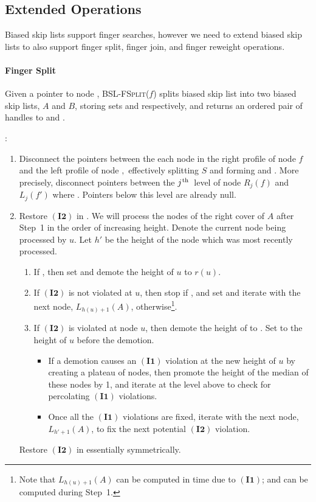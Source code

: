 \documentclass[11pt]{article}
\newcommand{\ens}[1]{\ensuremath{#1}}
\newcommand{\jth}{\ens{j^{\mbox{\hspace{.2mm}\scriptsize th}}}}
\newcommand{\Bslfsplx}[1]{\mbox{\textsc{BSL-FSplit(\ensuremath{#1})}}}
\newcommand{\invone}{\ensuremath{\mathbf{(I1)}}}
\newcommand{\invtwo}{\ensuremath{\mathbf{(I2)}}}
\newcommand{\prevheight}{\ensuremath{h'}}
\newcommand{\nodeheight}[1]{\ensuremath{h(#1)}}
\newcommand{\noderank}[1]{\ensuremath{r(\node #1)}}
\newcommand{\node}[1]{\ensuremath{#1}}
\newcommand{\bsl}[1]{\ensuremath{#1}}
\newcommand{\lvlpre}[2]{\ensuremath{L_{#1}(#2)}}
\newcommand{\lvlsuc}[2]{\ensuremath{R_{#1}(#2)}}
\begin{document}
\subsection{Extended Operations} 
\label{subsec:BSLExtOps} 
Biased skip lists support finger searches, however we need to extend biased skip lists to also support finger split, finger join, and finger reweight operations. 


\paragraph{Finger Split} Given a pointer to node , \Bslfsplx{f} splits biased skip list  into two biased skip lists, \bsl A and \bsl B, storing sets  and  respectively, and returns an ordered pair of handles to  and . 


\vspace{5mm} 
\noindent : 
\begin{enumerate} 
\item Disconnect the pointers between the each node in the right profile of node \node f and the left profile of node \node , effectively splitting \bsl S and forming  and . More precisely, disconnect pointers between the \jth\ level of node \lvlsuc{j}{f} and \lvlpre{j}{f'} where . Pointers below this level are already null. 

\item Restore \invtwo{} in .
We will process the nodes of the right cover of \bsl A after Step~1 in the order of increasing height. Denote the current node being processed by \node u. Let \prevheight{} be the height of the node which was most recently processed. 
\begin{enumerate} 
\item If , then set  and demote the height of \node u to \noderank u. 

\item  If \invtwo{} is not violated at \node u, then stop if , and set  and iterate with the next node, \lvlpre{\nodeheight{u}+1}{A}, otherwise\footnote{Note that \lvlpre{\nodeheight{u}+1}{A} can be computed in  time due to \invone{}; and  can be computed during Step~1.}. 

\item If \invtwo{} is violated at node \node u, then demote the height of  to . Set  to the height of \node u before the demotion. 

\begin{itemize} 
\item If a demotion causes an \invone{} violation at the new height of \node u by creating a plateau of  nodes, then promote the height of the median of these nodes by 1, and iterate at the level above to check for percolating \invone{} violations. 
\item Once all the \invone{} violations are fixed, iterate with the next node, \lvlpre{\prevheight +1}{A}, to fix the next potential \invtwo{} violation. 
\end{itemize} 

\end{enumerate} 

Restore \invtwo{} in  essentially symmetrically. 
\end{enumerate} 
\end{document}
